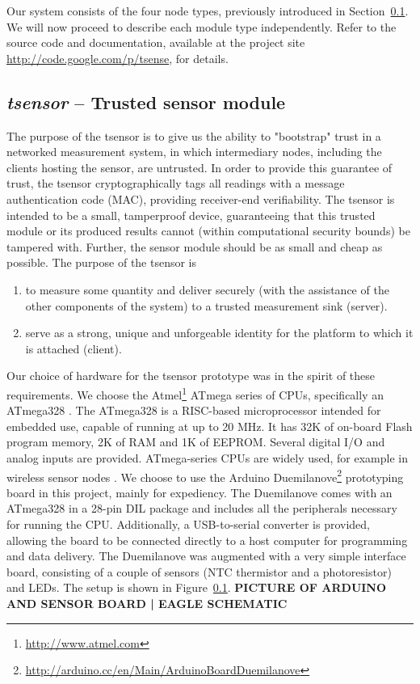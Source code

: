 Our system consists of the four node types, previously introduced in Section~\ref{}. We will now proceed to describe each module type independently. Refer to the source code and documentation, available at the project site \url{http://code.google.com/p/tsense}, for details.

\subsection{\textit{tsensor} -- Trusted sensor module}

The purpose of the tsensor is to give us the ability to "bootstrap" trust in a networked measurement system, in which intermediary nodes, including the clients hosting the sensor, are untrusted. In order to provide this guarantee of trust, the tsensor cryptographically tags all readings with a message authentication code (MAC), providing receiver-end verifiability. The tsensor is intended to be a small, tamperproof device, guaranteeing that this trusted module or its produced results cannot (within computational security bounds) be tampered with. Further, the sensor module should be as small and cheap as possible.
%
The purpose of the tsensor is
\begin{enumerate}
\item to measure some quantity and deliver securely (with the assistance of the other components of the system) to a trusted measurement sink (server).
\item serve as a strong, unique and unforgeable identity for the platform to which it is attached (client).
\end{enumerate}

Our choice of hardware for the tsensor prototype was in the spirit of these requirements. We choose the Atmel\footnote{\url{http://www.atmel.com}} ATmega series of CPUs, specifically an ATmega328 \cite{atmel-atmega-series-2010}. The ATmega328 is a RISC-based microprocessor intended for embedded use, capable of running at up to 20 MHz. It has 32K of on-board Flash program memory, 2K of RAM and 1K of EEPROM. Several digital I/O and analog inputs are provided. ATmega-series CPUs are widely used, for example in wireless sensor nodes .
%
We choose to use the Arduino Duemilanove\footnote{\url{http://arduino.cc/en/Main/ArduinoBoardDuemilanove}} prototyping board in this project, mainly for expediency. The Duemilanove comes with an ATmega328 in a  28-pin DIL package and includes all the peripherals necessary for running the CPU. Additionally, a USB-to-serial converter is provided, allowing the board to be connected directly to a host computer for programming and data delivery.
%
The Duemilanove was augmented with a very simple interface board, consisting of a couple of sensors (NTC thermistor and a photoresistor) and LEDs. The setup is shown in Figure~\ref{}.
%
\textbf{PICTURE OF ARDUINO AND SENSOR BOARD | EAGLE SCHEMATIC}

